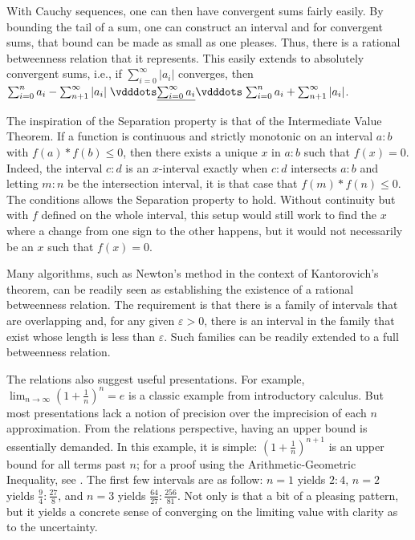 \documentclass[12pt]{article}
\begin{document}
With Cauchy sequences, one can then have convergent sums fairly easily. By bounding the tail of a sum, one can construct an interval and for convergent sums, that bound can be made as small as one pleases. Thus, there is a rational betweenness relation that it represents. This easily extends to absolutely convergent sums, i.e., if $ \sum_{i=0}^{\infty} |a_i|$ converges, then $\sum_{i=0}^n a_i - \sum_{n+1}^{\infty} |a_i| \xrel[\sum_{i=0}^{\infty} a_i] \sum_{i=0}^n a_i + \sum_{n+1}^{\infty} |a_i|$. 

The inspiration of the Separation property is that of the Intermediate Value Theorem. If a function is continuous and strictly monotonic on an interval $a:b$ with $f(a)*f(b) \leq 0$, then there exists a unique $x$ in $a:b$ such that $f(x) = 0$. Indeed, the interval $c:d$ is an $x$-interval exactly when $c:d$ intersects $a:b$ and letting $m:n$ be the intersection interval, it is that case that $f(m)*f(n) \leq 0$. The conditions allows the Separation property to hold. Without continuity but with $f$ defined on the whole interval, this setup would still work to find the $x$ where a change from one sign to the other  happens, but it would not necessarily be an $x$ such that $f(x) = 0$.

Many algorithms, such as Newton's method in the context of Kantorovich's theorem, can be readily seen as establishing the existence of a rational betweenness relation. The requirement is that there is a family of intervals that are overlapping and, for any given $\varepsilon >0$, there is an interval in the family that exist whose length is less than $\varepsilon$. Such families can be readily extended to a full betweenness relation. 

The relations also suggest useful presentations. For example, $\lim_{n \to \infty} (1+\frac{1}{n})^n = e$ is a classic example from introductory calculus. But most presentations lack a notion of precision over the imprecision of each $n$ approximation. From the relations perspective, having an upper bound is essentially demanded. In this example, it is simple: $(1 + \frac{1}{n})^{n+1}$ is an upper bound for all terms past $n$; for a proof using the Arithmetic-Geometric Inequality, see \cite{mend}. The first few intervals are as follow: $n=1$ yields $2:4$, $n=2$ yields $\frac{9}{4}:\frac{27}{8}$, and $n=3$ yields $\frac{64}{27}:\frac{256}{81}$. Not only is that a bit of a pleasing pattern, but it yields a concrete sense of converging on the limiting  value with clarity as to the uncertainty. 
\end{document}
